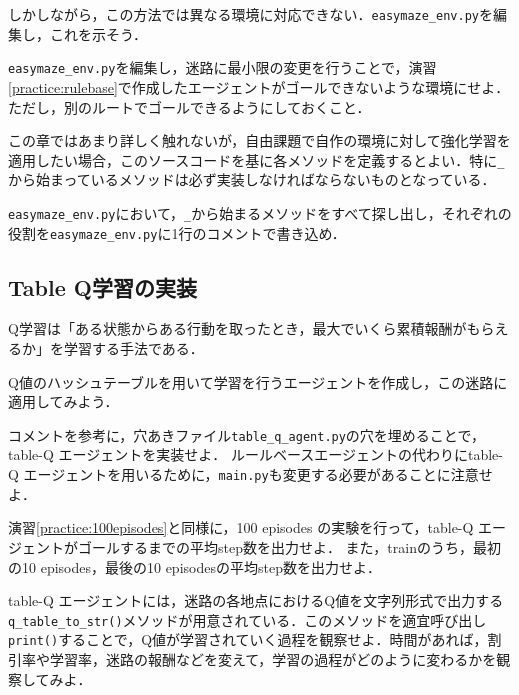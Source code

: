   しかしながら，この方法では異なる環境に対応できない．\verb+easymaze_env.py+を編集し，これを示そう．

  \begin{practice}
   \verb+easymaze_env.py+を編集し，迷路に最小限の変更を行うことで，演習\ref{practice:rulebase}で作成したエージェントがゴールできないような環境にせよ．ただし，別のルートでゴールできるようにしておくこと．
  \end{practice}

  この章ではあまり詳しく触れないが，自由課題で自作の環境に対して強化学習を適用したい場合，このソースコードを基に各メソッドを定義するとよい．特に\verb+_+から始まっているメソッドは必ず実装しなければならないものとなっている．

  \begin{practice}
   \verb+easymaze_env.py+において，\verb+_+から始まるメソッドをすべて探し出し，それぞれの役割を\verb+easymaze_env.py+に1行のコメントで書き込め．
  \end{practice}

  \subsection{Table Q学習の実装}
  Q学習は「ある状態からある行動を取ったとき，最大でいくら累積報酬がもらえるか」を学習する手法である．

  Q値のハッシュテーブルを用いて学習を行うエージェントを作成し，この迷路に適用してみよう．

  \begin{practice}
   コメントを参考に，穴あきファイル\verb+table_q_agent.py+の穴を埋めることで，table-Q エージェントを実装せよ．
   ルールベースエージェントの代わりにtable-Q エージェントを用いるために，\verb+main.py+も変更する必要があることに注意せよ．
  \end{practice}

  \begin{practice}
   演習\ref{practice:100episodes}と同様に，100 episodes の実験を行って，table-Q エージェントがゴールするまでの平均step数を出力せよ．
   また，trainのうち，最初の10 episodes，最後の10 episodesの平均step数を出力せよ．
  \end{practice}

  \begin{practice}
   table-Q エージェントには，迷路の各地点におけるQ値を文字列形式で出力する\verb+q_table_to_str()+メソッドが用意されている．このメソッドを適宜呼び出し\verb+print()+することで，Q値が学習されていく過程を観察せよ．時間があれば，割引率や学習率，迷路の報酬などを変えて，学習の過程がどのように変わるかを観察してみよ．
  \end{practice}

